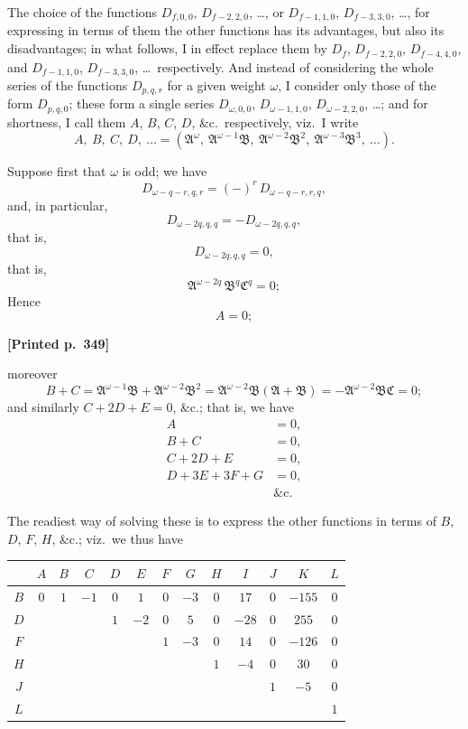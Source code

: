 \documentclass[11pt]{article}
\begin{document}
The choice of the functions $D_{f, 0, 0}$, $D_{f - 2, 2, 0}$, \dots, or $D_{f - 1, 1, 0}$, $D_{f - 3, 3, 0}$, \dots, for expressing in terms of them the other functions has its advantages, but also its disadvantages; in what follows, I in effect replace them by $D_{f}$, $D_{f - 2, 2, 0}$, $D_{f - 4, 4, 0}$, and $D_{f - 1, 1, 0}$, $D_{f - 3, 3, 0}$, \dots\ respectively. And instead of considering the whole series of the functions $D_{p, q, r}$ for a given weight $\omega$, I consider only those of the form $D_{p, q, 0}$; these form a single series $D_{\omega, 0, 0}$, $D_{\omega - 1, 1, 0}$, $D_{\omega - 2, 2, 0}$, \dots; and for shortness, I call them $A$, $B$, $C$, $D$, \&c.\ respectively, viz.\ I write
\[
A,\ B,\ C,\ D,\ \dots = (\mathfrak{A}^{\omega},\ \mathfrak{A}^{\omega - 1}\mathfrak{B},\ \mathfrak{A}^{\omega - 2}\mathfrak{B}^{2},\ \mathfrak{A}^{\omega - 3}\mathfrak{B}^{3},\ \dots).
\]

Suppose first that $\omega$ is odd; we have
\[
D_{\omega - q - r, q, r} = (-)^{r}\, D_{\omega - q - r, r, q},
\]
and, in particular,
\[
D_{\omega - 2q, q, q} = -D_{\omega - 2q, q, q},
\]
that is,
\[
D_{\omega - 2q, q, q} = 0,
\]
that is,
\[
\mathfrak{A}^{\omega - 2q}\,\mathfrak{B}^{q}\mathfrak{C}^{q} = 0;
\]
Hence
\[
A = 0;
\]

\medskip

\noindent\textbf{[Printed p.~349]}\hfill

\noindent moreover
\[
B + C = \mathfrak{A}^{\omega - 1}\mathfrak{B} + \mathfrak{A}^{\omega - 2}\mathfrak{B}^{2} = \mathfrak{A}^{\omega - 2}\mathfrak{B}(\mathfrak{A} + \mathfrak{B}) = -\mathfrak{A}^{\omega - 2}\mathfrak{B}\mathfrak{C} = 0;
\]
and similarly $C + 2D + E = 0$, \&c.; that is, we have
\begin{align*}
A &= 0, \\
B + C &= 0, \\
C + 2D + E &= 0, \\
D + 3E + 3F + G &= 0, \\
&\text{\&c.}
\end{align*}

The readiest way of solving these is to express the other functions in terms of $B$, $D$, $F$, $H$, \&c.; viz.\ we thus have

\medskip

\begin{center}
\small
\begin{tabular}{|c|cccccccccccc|}
\hline
 & $A$ & $B$ & $C$ & $D$ & $E$ & $F$ & $G$ & $H$ & $I$ & $J$ & $K$ & $L$ \\
\hline
$B$ & $0$ & $1$ & $-1$ & $0$ & $1$ & $0$ & $-3$ & $0$ & $17$ & $0$ & $-155$ & $0$ \\
$D$ & & & & $1$ & $-2$ & $0$ & $5$ & $0$ & $-28$ & $0$ & $255$ & $0$ \\
$F$ & & & & & & $1$ & $-3$ & $0$ & $14$ & $0$ & $-126$ & $0$ \\
$H$ & & & & & & & & $1$ & $-4$ & $0$ & $30$ & $0$ \\
$J$ & & & & & & & & & & $1$ & $-5$ & $0$ \\
$L$ & & & & & & & & & & & & $1$ \\
\hline
\end{tabular}
\end{center}
\end{document}
